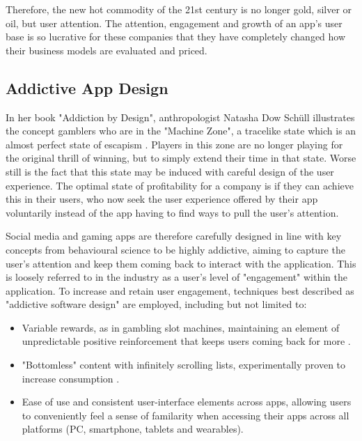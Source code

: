 Therefore, the new hot commodity of the 21st century is no longer gold, silver or oil, but user attention. The attention, engagement and growth of an app's user base is so lucrative for these companies that they have completely changed how their business models are evaluated and priced.

\subsection{Addictive App Design}
In her book "Addiction by Design", anthropologist Natasha Dow Schüll illustrates the concept gamblers who are in the "Machine Zone", a tracelike state which is an almost perfect state of escapism \cite{schull2014addiction}. Players in this zone are no longer playing for the original thrill of winning, but to simply extend their time in that state. Worse still is the fact that this state may be induced with careful design of the user experience. The optimal state of profitability for a company is if they can achieve this in their users, who now seek the user experience offered by their app voluntarily instead of the app having to find ways to pull the user's attention.

Social media and gaming apps are therefore carefully designed in line with key concepts from behavioural science to be highly addictive, aiming to capture the user's attention and keep them coming back to interact with the application. This is loosely referred to in the industry as a user's level of "engagement" within the application. To increase and retain user engagement, techniques best described as "addictive software design" \cite{neyman2017survey} are employed, including but not limited to:

\begin{itemize}
    \item Variable rewards, as in gambling slot machines, maintaining an element of unpredictable positive reinforcement that keeps users coming back for more \cite{neyman2017survey}.
    \item "Bottomless" content with infinitely scrolling lists, experimentally proven to increase consumption \cite{neyman2017survey}.
    \item Ease of use and consistent user-interface elements across apps, allowing users to conveniently feel a sense of familarity when accessing their apps across all platforms (PC, smartphone, tablets and wearables).
\end{itemize}

